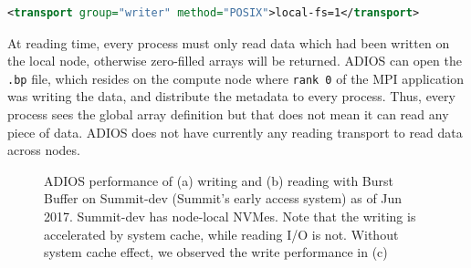 \begin{lstlisting}[language=XML]
<transport group="writer" method="POSIX">local-fs=1</transport>
\end{lstlisting}

At reading time, every process must only read data which had been written on the local node, otherwise zero-filled arrays will be returned. ADIOS can open the \verb+.bp+ file, which resides on the compute node where \verb+rank 0+ of the MPI application was writing the data, and distribute the metadata to every process. Thus, every process sees the global array definition but that does not mean it can read any piece of data. ADIOS does not have currently any reading transport to read data across nodes. 

\begin{figure}[h]
\center
{}
\caption{ADIOS performance of (a) writing and (b) reading with Burst Buffer on Summit-dev (Summit's early access system) as of Jun 2017. Summit-dev has node-local NVMes. Note that the writing is accelerated by system cache, while reading I/O is not. Without system cache effect, we observed the write performance in (c)}
\label{fig:summit}
\end{figure}

